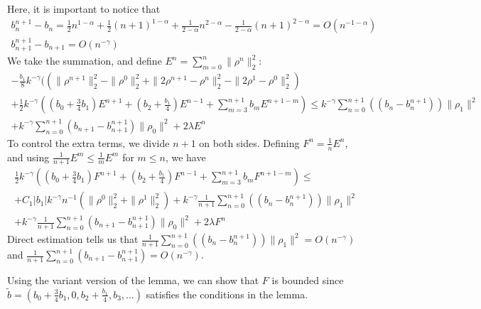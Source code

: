 \documentclass[11pt]{article}
\begin{document}
Here, it is important to notice that 
\begin{gather*}
b_n^{n+1}-b_n=\frac{1}{2}n^{1-\alpha}+\frac{1}{2}(n+1)^{1-\alpha}
+\frac{1}{2-\alpha}n^{2-\alpha}
-\frac{1}{2-\alpha}(n+1)^{2-\alpha}=O(n^{-1-\alpha})\\
b_{n+1}^{n+1}-b_{n+1}=O(n^{-\gamma})
\end{gather*}
We take the summation, and define $E^n=\sum_{m=0}^n\|\rho^n\|_2^2$:
\begin{multline*}
-\frac{b_1}{8}k^{-\gamma}((\|\rho^{n+1}\|_2^2-\|\rho^0\|_2^2+\|2\rho^{n+1}-\rho^n\|_2^2-\|2\rho^1-\rho^{0}\|_2^2)\\
+\frac{1}{2}k^{-\gamma}\left((b_0+\frac{3}{4}b_1)E^{n+1}
+(b_2+\frac{b_1}{4})E^{n-1}
+\sum_{m=3}^{n+1}b_mE^{n+1-m}\right)
\le k^{-\gamma}\sum_{n=0}^{n+1}((b_{n}-b^{n+1}_n))\|\rho_1\|^2\\
+k^{-\gamma}\sum_{n=0}^{n+1}(b_{n+1}-b_{n+1}^{n+1})\|\rho_0\|^2
+2\lambda E^n
\end{multline*}
To control the extra terms, we divide $n+1$ on both sides. Defining $F^n=\frac{1}{n}E^n$, and using $\frac{1}{n+1}E^m\le \frac{1}{m}E^m$ for $m\le n$, we have 
\begin{multline*}
\frac{1}{2}k^{-\gamma}\left((b_0+\frac{3}{4}b_1)F^{n+1}
+(b_2+\frac{b_1}{4})F^{n-1}
+\sum_{m=3}^{n+1}b_mF^{n+1-m}\right)
\le\\
+C_1|b_1|k^{-\gamma}n^{-1}(\|\rho^0\|_2^2+\|\rho^1\|_2^2)
+  k^{-\gamma}\frac{1}{n+1}\sum_{n=0}^{n+1}((b_{n}-b^{n+1}_n))\|\rho_1\|^2\\
+k^{-\gamma}\frac{1}{n+1}\sum_{n=0}^{n+1}(b_{n+1}-b_{n+1}^{n+1})\|\rho_0\|^2+2\lambda F^n
\end{multline*}
Direct estimation tells us that $\frac{1}{n+1}\sum_{n=0}^{n+1}((b_{n}-b^{n+1}_n))\|\rho_1\|^2=O(n^{-\gamma})$ and $\frac{1}{n+1}\sum_{n=0}^{n+1}(b_{n+1}-b_{n+1}^{n+1})=O(n^{-\gamma})$.

Using the variant version of the lemma, we can show that $F$ is bounded since $\tilde{b}=(b_0+\frac{3}{4}b_1,0, b_2+\frac{b_1}{4}, b_3,\ldots)$ satisfies the conditions in the lemma.
\end{document}

